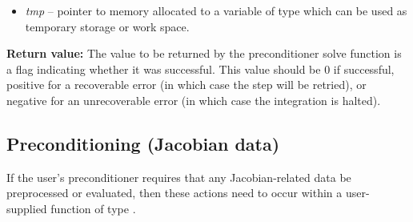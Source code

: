 \documentclass[letterpaper,10pt,english]{sphinxmanual}
\begin{document}
\begin{fulllineitems}
\begin{description}
\begin{itemize}
\item {} 
\emph{tmp} -- pointer to memory allocated to a variable of type
 which can be used as temporary storage or work space.

\end{itemize}

\end{description}

\textbf{Return value:}
The value to be returned by the preconditioner solve
function is a flag indicating whether it was successful. This value
should be 0 if successful, positive for a recoverable error (in
which case the step will be retried), or negative for an
unrecoverable error (in which case the integration is halted).

\end{fulllineitems}



\subsection{Preconditioning (Jacobian data)}
\label{c_interface/User_supplied:cinterface-precsetupfn}\label{c_interface/User_supplied:preconditioning-jacobian-data}
If the user's preconditioner requires that any Jacobian-related data
be preprocessed or evaluated, then these actions need to occur within
a user-supplied function of type {\hyperref[c_interface/User_supplied:ARKSpilsPrecSetupFn]{}}.
\end{document}
